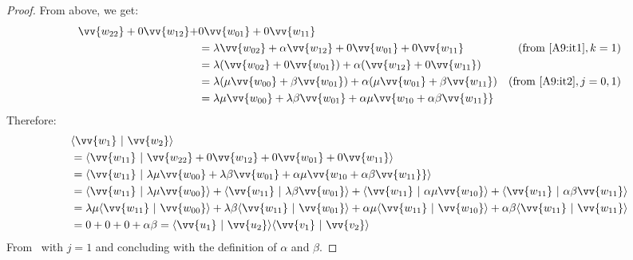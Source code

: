 \documentclass[runningheads,orivec,envcountsame,envcountsect]{llncs}
\def\scal#1#2{\langle{#1}~|~{#2}\rangle}
\begin{document}
\begin{lemma}
\begin{proof}
    From above, we get:
    \begin{align*}
        \vv{w_{22}} + 0\vv{w_{12}} + &0\vv{w_{01}} + 0\vv{w_{11}} \\
        &= \lambda\vv{w_{02}} + \alpha\vv{w_{12}} + 0\vv{w_{01}} + 0\vv{w_{11}} & (\text{from~\Cref{A9:it1}}, k =1)\\
        &= \lambda(\vv{w_{02}}+0\vv{w_{01}}) + \alpha(\vv{w_{12}}+0\vv{w_{11}})&\\
        &= \lambda(\mu\vv{w_{00}} + \beta\vv{w_{01}}) + \alpha(\mu\vv{w_{01}}+\beta\vv{w_{11}}) & (\text{from~\Cref{A9:it2}}, j=0,1)\\
        &= \lambda\mu\vv{w_{00}} + \lambda\beta\vv{w_{01}} + \alpha\mu\vv{w_{10} + \alpha\beta\vv{w_{11}}}
    \end{align*}
    Therefore:
    \begin{align*}
        &\scal{\vv{w_1}}{\vv{w_2}} \\
        &= \scal{\vv{w_{11}}}{\vv{w_{22}} + 0 \vv{w_{12}} + 0 \vv{w_{01}} + 0 \vv{w_{11}}}\\
        &= \scal{\vv{w_{11}}}{\lambda\mu\vv{w_{00}} + \lambda\beta\vv{w_{01}} + \alpha\mu\vv{w_{10} + \alpha\beta\vv{w_{11}}}}\\
        &=\scal{\vv{w_{11}}}{\lambda\mu\vv{w_{00}}} + \scal{\vv{w_{11}}}{\lambda\beta\vv{w_{01}}} + \scal{\vv{w_{11}}}{\alpha\mu\vv{w_{10}}} + \scal{\vv{w_{11}}}{\alpha\beta\vv{w_{11}}}\\
        &=\lambda\mu\scal{\vv{w_{11}}}{\vv{w_{00}}} + \lambda\beta\scal{\vv{w_{11}}}{\vv{w_{01}}} + \alpha\mu\scal{\vv{w_{11}}}{\vv{w_{10}}} + \alpha\beta\scal{\vv{w_{11}}}{\vv{w_{11}}}\\
        &= 0 + 0 + 0 + \alpha\beta = \scal{\vv{u_1}}{\vv{u_2}}\scal{\vv{v_1}}{\vv{v_2}}
    \end{align*}
    From~ with $j=1$ and concluding with the definition of $\alpha$ and $\beta$.
\end{proof}
\end{lemma}
\end{document}
